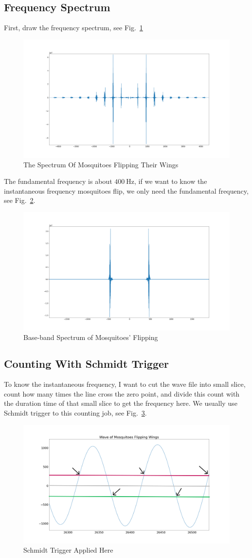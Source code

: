 \documentclass{article}
\begin{document}
\subsection{Frequency Spectrum}
First, draw the frequency spectrum, see Fig.~\ref{fig:MosquitoSpec}
\begin{figure}[!h]
	\centering
	\includegraphics[width=3 in]{../pic/MosquitoSpec.png}
	\caption{The Spectrum Of Mosquitoes Flipping Their Wings}
	\label{fig:MosquitoSpec}
\end{figure}
The fundamental frequency is about $400~\mathrm{Hz}$, if we want to know the instantaneous frequency mosquitoes flip, we only need the fundamental frequency, see Fig.~\ref{fig:FilteredMosquito}.
\begin{figure}[!h]
	\centering
	\includegraphics[width=3 in]{../pic/FilteredMosquitoFlip.png}
	\caption{Base-band Spectrum of Mosquitoes' Flipping}
	\label{fig:FilteredMosquito}
\end{figure}

\subsection{Counting With Schmidt Trigger}
To know the instantaneous frequency, I want to cut the wave file into small slice, count how many times the line cross the zero point, and divide this count with the duration time of that small slice to get the frequency here. We usually use Schmidt trigger to this counting job, see Fig.~\ref{fig:CountFlipping}.
\begin{figure}[!h]
	\centering
	\includegraphics[width=3 in]{../pic/CountFlipping.png}
	\caption{Schmidt Trigger Applied Here}
	\label{fig:CountFlipping}
\end{figure}
\end{document}
